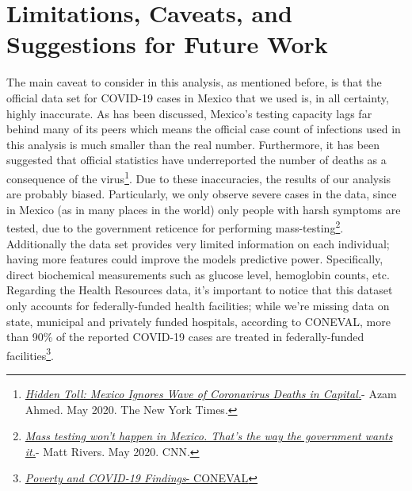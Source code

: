 \documentclass[hidelinks,10pt]{article}
\begin{document}
	\section{Limitations, Caveats, and Suggestions for Future Work}
	The main caveat to consider in this analysis, as mentioned before, is that the official data set for COVID-19 cases in Mexico that we used is, in all certainty, highly inaccurate.
	As has been discussed, Mexico’s testing capacity lags far behind many of its peers which means the official case count of infections used in this analysis is much smaller than the real number. Furthermore, it has been suggested that official statistics have underreported the number of deaths as a consequence of the virus\footnote{\href{https://www.nytimes.com/2020/05/08/world/americas/mexico-coronavirus-count.html}{\textit{Hidden Toll: Mexico Ignores Wave of Coronavirus Deaths in Capital.}}- Azam Ahmed. May 2020. The New York Times.}. Due to these inaccuracies, the results of our analysis are probably biased. Particularly, we only observe severe cases in the data, since in Mexico (as in many places in the world) only people with harsh symptoms are tested, due to the government reticence for performing mass-testing\footnote{\href{https://www.cnn.com/2020/05/15/americas/mexico-coronavirus-testing-intl/index.html}{\textit{Mass testing won't happen in Mexico. That's the way the government wants it.}}- Matt Rivers. May 2020. CNN.}. Additionally the data set provides very limited information on each individual; having more features could improve the models predictive power. Specifically, direct biochemical measurements such as glucose level, hemoglobin counts, etc.\\
	Regarding the Health Resources data, it's important to notice that this dataset only accounts for federally-funded health facilities; while we're missing data on state, municipal and privately funded hospitals, according to CONEVAL, more than 90\% of the reported COVID-19 cases are treated in federally-funded facilities\footnote{\href{https://www.coneval.org.mx/Medicion/MP/Paginas/Hallazgos\_Visor.aspx}{\textit{ Poverty and COVID-19 Findings}- CONEVAL}}.

	
	\newpage
\end{document}
